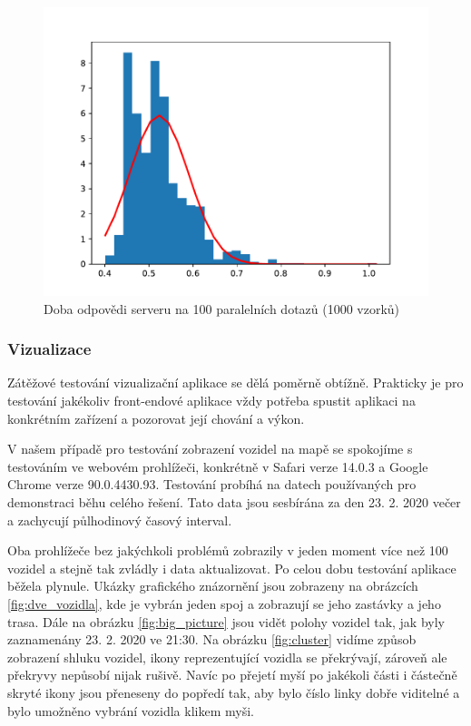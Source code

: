 \begin{figure}
   \centering
 \includegraphics[width=0.7\linewidth]{../img/server_response_time}
 \caption{Doba odpovědi serveru na 100 paralelních dotazů (1000 vzorků)}
 \label{fig:server_response_time}
\end{figure}


\subsubsection{Vizualizace}


Zátěžové testování vizualizační aplikace se dělá poměrně obtížně. Prakticky je pro testování jakékoliv front-endové aplikace vždy potřeba spustit aplikaci na konkrétním zařízení a pozorovat její chování a výkon.


\bigbreak


V našem případě pro testování zobrazení vozidel na mapě se spokojíme s testováním ve webovém prohlížeči, konkrétně v Safari verze 14.0.3 a Google Chrome verze 90.0.4430.93. Testování probíhá na datech používaných pro demonstraci běhu celého řešení. Tato data jsou sesbírána za den 23. 2. 2020 večer a zachycují půlhodinový časový interval.


\bigbreak


Oba prohlížeče bez jakýchkoli problémů zobrazily v jeden moment více než 100 vozidel a stejně tak zvládly i data aktualizovat. Po celou dobu testování aplikace běžela plynule. Ukázky grafického znázornění jsou zobrazeny na obrázcích \ref{fig:dve_vozidla}, kde je vybrán jeden spoj a zobrazují se jeho zastávky a jeho trasa. Dále na obrázku \ref{fig:big_picture} jsou vidět polohy vozidel tak, jak byly zaznamenány 23. 2. 2020 ve 21:30. Na obrázku \ref{fig:cluster} vidíme způsob zobrazení shluku vozidel, ikony reprezentující vozidla se překrývají, zároveň ale překryvy nepůsobí nijak rušivě. Navíc po přejetí myší po jakékoli části i částečně skryté ikony jsou přeneseny do popředí tak, aby bylo číslo linky dobře viditelné a bylo umožněno vybrání vozidla klikem myši.


